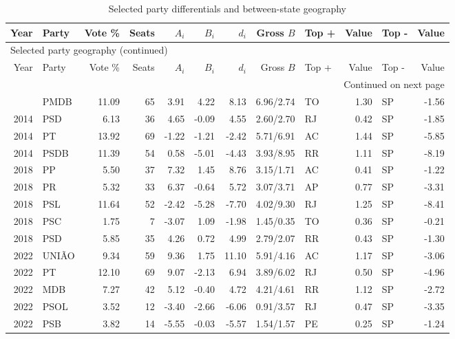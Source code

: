 \begin{landscape}
\begingroup
\scriptsize
\setlength{\tabcolsep}{3.0pt}
\begin{longtable}{rlrrrrrrlrlr}
\caption{Selected party differentials and between-state geography}\label{tab:accounting-party-geography} \\
\toprule
Year & Party & Vote \% & Seats & \(A_i\) & \(B_i\) & \(d_i\) & Gross \(B\) & Top + & Value & Top - & Value \\
\midrule
\endfirsthead
\multicolumn{12}{l}{\footnotesize Selected party geography (continued)} \\
\toprule
Year & Party & Vote \% & Seats & \(A_i\) & \(B_i\) & \(d_i\) & Gross \(B\) & Top + & Value & Top - & Value \\
\midrule
\endhead
\midrule
\multicolumn{12}{r}{\footnotesize Continued on next page} \\
\endfoot
\bottomrule
\endlastfoot
2014 & PMDB & 11.09 & 65 & 3.91 & 4.22 & 8.13 & 6.96/2.74 & TO & 1.30 & SP & -1.56 \\
2014 & PSD & 6.13 & 36 & 4.65 & -0.09 & 4.55 & 2.60/2.70 & RJ & 0.42 & SP & -1.85 \\
2014 & PT & 13.92 & 69 & -1.22 & -1.21 & -2.42 & 5.71/6.91 & AC & 1.44 & SP & -5.85 \\
2014 & PSDB & 11.39 & 54 & 0.58 & -5.01 & -4.43 & 3.93/8.95 & RR & 1.11 & SP & -8.19 \\
2018 & PP & 5.50 & 37 & 7.32 & 1.45 & 8.76 & 3.15/1.71 & AC & 0.41 & SP & -1.22 \\
2018 & PR & 5.32 & 33 & 6.37 & -0.64 & 5.72 & 3.07/3.71 & AP & 0.77 & SP & -3.31 \\
2018 & PSL & 11.64 & 52 & -2.42 & -5.28 & -7.70 & 4.02/9.30 & RJ & 1.25 & SP & -8.41 \\
2018 & PSC & 1.75 & 7 & -3.07 & 1.09 & -1.98 & 1.45/0.35 & TO & 0.36 & SP & -0.21 \\
2018 & PSD & 5.85 & 35 & 4.26 & 0.72 & 4.99 & 2.79/2.07 & RR & 0.43 & SP & -1.30 \\
2022 & UNIÃO & 9.34 & 59 & 9.36 & 1.75 & 11.10 & 5.91/4.16 & AC & 1.17 & SP & -3.06 \\
2022 & PT & 12.10 & 69 & 9.07 & -2.13 & 6.94 & 3.89/6.02 & RJ & 0.50 & SP & -4.96 \\
2022 & MDB & 7.27 & 42 & 5.12 & -0.40 & 4.72 & 4.21/4.61 & RR & 1.12 & SP & -2.72 \\
2022 & PSOL & 3.52 & 12 & -3.40 & -2.66 & -6.06 & 0.91/3.57 & RJ & 0.47 & SP & -3.35 \\
2022 & PSB & 3.82 & 14 & -5.55 & -0.03 & -5.57 & 1.54/1.57 & PE & 0.25 & SP & -1.24 \\

\end{longtable}
\end{landscape}
